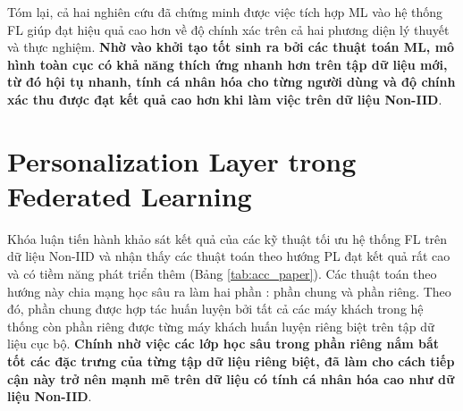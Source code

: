 Tóm lại, cả hai nghiên cứu \parencite{chen2018federated, fallah2020personalized} đã chứng minh được việc tích hợp ML vào hệ thống FL giúp đạt hiệu quả cao hơn  về độ chính xác trên cả hai phương diện lý thuyết và thực nghiệm. \textbf{Nhờ vào khởi tạo tốt sinh ra bởi các thuật toán ML, mô hình toàn cục có khả năng thích ứng nhanh hơn trên tập dữ liệu mới, từ đó hội tụ nhanh, tính cá nhân hóa cho từng người dùng và độ chính xác thu được đạt kết quả cao hơn}  \textbf{khi làm việc trên dữ liệu Non-IID}.

\section{Personalization Layer trong Federated Learning}

Khóa luận tiến hành khảo sát kết quả của các kỹ thuật tối ưu hệ thống FL trên dữ liệu Non-IID và nhận thấy các thuật toán theo hướng PL đạt kết quả rất cao và có tiềm năng phát triển thêm (Bảng \ref{tab:acc_paper}). Các thuật toán theo hướng này chia mạng học sâu ra làm hai phần \cite{zhu2021federated}: phần chung và phần riêng. Theo đó, phần chung được hợp tác huấn luyện bởi tất cả các máy khách trong hệ thống còn phần riêng được từng máy khách huấn luyện riêng biệt trên tập dữ liệu cục bộ. \textbf{Chính nhờ việc các lớp học sâu trong phần riêng nắm bắt tốt các đặc trưng của từng tập dữ liệu riêng biệt, đã làm cho cách tiếp cận này trở nên mạnh mẽ trên dữ liệu có tính cá nhân hóa cao như dữ liệu Non-IID}.

\begin{table}[H]
    \centering
    \caption{Độ chính xác (\%) của các hệ thống FL trên dữ liệu Non-IID của tập dữ liệu CIFAR-10 \cite{shamsian2021personalized}. Các thuật toán PL được in đậm.}
    \label{tab:acc_paper}
\end{table}

